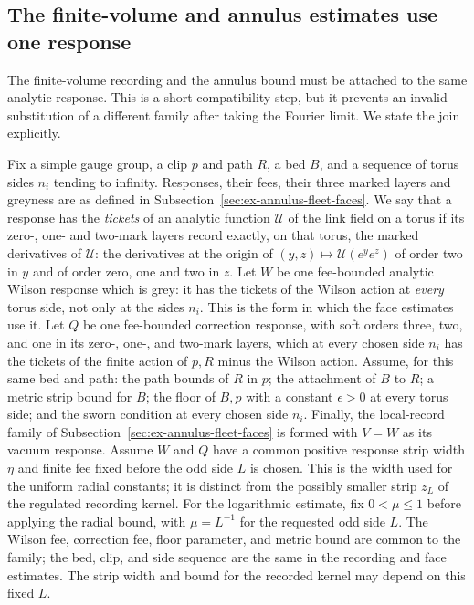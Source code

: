\subsection{The finite-volume and annulus estimates use one response}
\label{sec:ex-annulus-same-data}

The finite-volume recording and the annulus bound must be attached to the
same analytic response. This is a short compatibility step, but it prevents
an invalid substitution of a different family after taking the Fourier
limit. We state the join explicitly.

Fix a simple gauge group, a clip $p$ and path $R$, a bed $B$, and a
sequence of torus sides $n_i$ tending to infinity. Responses, their
fees, their three marked layers and greyness are as defined in
Subsection~\ref{sec:ex-annulus-fleet-faces}. We say that a response has the
\emph{tickets} of an analytic function $\mathcal U$ of the link field on
a torus if its zero-, one- and two-mark layers record exactly, on that
torus, the marked derivatives of $\mathcal U$: the derivatives at the
origin of $(y,z)\mapsto\mathcal U(e^ye^z)$ of order two in $y$ and of
order zero, one and two in $z$. Let $W$ be one fee-bounded analytic
Wilson response which is grey: it has the tickets of the Wilson action
at \emph{every} torus side, not only at the sides $n_i$. This is the
form in which the face estimates use it. Let $Q$ be one
fee-bounded correction response, with soft orders three, two, and one in
its zero-, one-, and two-mark layers, which at every chosen side $n_i$
has the tickets of the finite action of $p,R$ minus the Wilson action.
Assume, for this same bed and path: the path bounds of $R$ in $p$; the
attachment of $B$ to $R$; a metric strip bound for $B$; the floor of
$B,p$ with a constant $\epsilon>0$ at every torus side; and the sworn
condition at every chosen side $n_i$. Finally, the local-record family
of Subsection~\ref{sec:ex-annulus-fleet-faces} is formed with $V=W$ as its
vacuum response.
Assume $W$ and $Q$ have a common positive response strip width $\eta$ and
finite fee fixed before the odd side $L$ is chosen. This is the width used
for the uniform radial constants; it is distinct from the possibly smaller
strip $z_L$ of the regulated recording kernel.
For the logarithmic estimate, fix $0<\mu\leq1$ before applying the radial
bound, with $\mu=L^{-1}$ for the requested odd side $L$. The Wilson fee,
correction fee, floor parameter, and metric bound are common to the family;
the bed, clip, and side sequence are the same in the recording and face
estimates. The strip width and bound for the recorded kernel may depend on
this fixed $L$.

